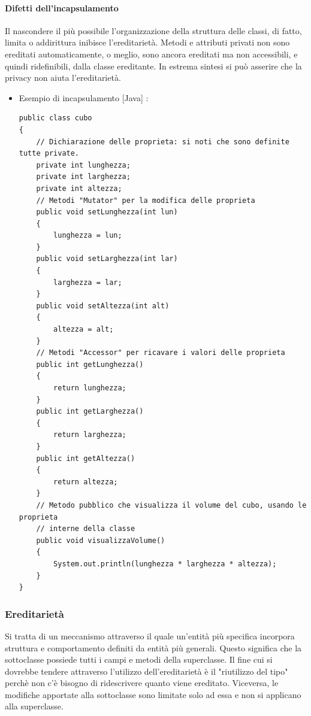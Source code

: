 \paragraph{Difetti dell'incapsulamento}

Il nascondere il più possibile l'organizzazione della struttura delle classi, di fatto, limita o addirittura inibisce l'ereditarietà. Metodi e attributi privati non sono ereditati automaticamente, o meglio, sono ancora ereditati ma non accessibili, e quindi ridefinibili, dalla classe ereditante. In estrema sintesi si può asserire che la privacy non aiuta l'ereditarietà.

    \begin{itemize}
    \item Esempio di incapsulamento [Java] :
    \begin{lstlisting}
public class cubo
{
    // Dichiarazione delle proprieta: si noti che sono definite tutte private.
    private int lunghezza;
    private int larghezza;
    private int altezza;
    // Metodi "Mutator" per la modifica delle proprieta
    public void setLunghezza(int lun)
    {
        lunghezza = lun;
    }
    public void setLarghezza(int lar)
    {
        larghezza = lar;
    }
    public void setAltezza(int alt)
    {
        altezza = alt;
    }
    // Metodi "Accessor" per ricavare i valori delle proprieta
    public int getLunghezza()
    {
        return lunghezza;
    }
    public int getLarghezza()
    {
        return larghezza;
    }
    public int getAltezza()
    {
        return altezza;
    }
    // Metodo pubblico che visualizza il volume del cubo, usando le proprieta
    // interne della classe
    public void visualizzaVolume()
    {
        System.out.println(lunghezza * larghezza * altezza);
    }
}    \end{lstlisting}
     \end{itemize}


\subsubsection{Ereditarietà}

Si tratta di un meccanismo attraverso il quale un'entità più specifica incorpora struttura e comportamento definiti da entità più generali. Questo significa che la sottoclasse possiede tutti i campi e metodi della superclasse. Il fine cui si dovrebbe tendere attraverso l'utilizzo dell'ereditarietà è il "riutilizzo del tipo" perchè non c'è bisogno di ridescrivere quanto viene ereditato. Viceversa, le modifiche apportate alla sottoclasse sono limitate solo ad essa e non si applicano alla superclasse.

